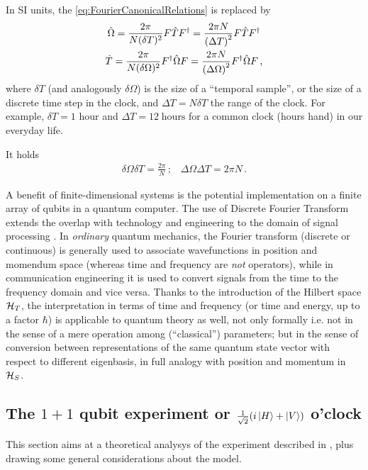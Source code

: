 In SI units, the \eqref{eq:FourierCanonicalRelations} is replaced by
\begin{gather}
  \label{eq:SI_Fourier:Omega}
    \hat{\Omega} = \frac{2\pi}{N(\delta T)^2} F \hat{T} F^{\dagger} = \frac{2\pi N}{\qty(\Delta T)^2} F \hat{T} F^{\dagger} \\
  \label{eq:SI_Fourier:T}
    \hat{T} = \frac{2\pi}{N(\delta\Omega)^2} F^{\dagger} \hat{\Omega} F = \frac{2\pi N}{\qty(\Delta\Omega)^2} F^{\dagger} \hat{\Omega} F
  \, \text{,}
\end{gather}
where $\delta T$ (and analogously $\delta\Omega$)
is the size of a ``temporal sample'', or the size of a discrete
time step in the clock, and $\Delta T = N\delta T$ the range of the clock.
For example,
$\delta T = \text{1 hour}$ and $\Delta T=12\;\text{hours}$
for a common clock (hours hand) in our everyday life.

It holds
\begin{gather}
  \delta\Omega \delta T = \frac{2\pi}{N} \, \text{;} \quad
  \Delta\Omega \Delta T = 2\pi N \, \text{.}
\end{gather}

A benefit of finite-dimensional systems is the potential implementation on a finite array of
qubits in a quantum computer. The use of Discrete Fourier Transform extends the overlap
with technology and engineering to the domain of signal processing \parencite{FiniteHilb}.
In \emph{ordinary} quantum mechanics, the Fourier transform (discrete or continuous)
is generally used
to associate wavefunctions in position and momendum space
(whereas time and frequency are \emph{not} operators),
while in communication engineering it is used to convert signals
from the time to the frequency domain and vice versa.
Thanks to the introduction of the Hilbert space $\mathcal{H}_T$,
the interpretation in terms of time and frequency
(or time and energy, up to a factor $\hbar$)
is applicable to quantum theory as well, not only formally
i.e. not in the sense of a mere operation among (``classical'') parameters;
but in the sense of conversion between representations of the
same quantum state vector with respect to different eigenbasis,
in full analogy with position and momentum in $\mathcal{H}_S$.

\subsection{The $1 + 1$ qubit experiment or $\frac{1}{\sqrt{2}}\qty(i\ket{H} + \ket{V})$ o'clock}

This section aims at a theoretical analysys of the experiment
described in \cite{Moreva:synthetic, Moreva:illustration},
plus drawing some general considerations about the model. 

